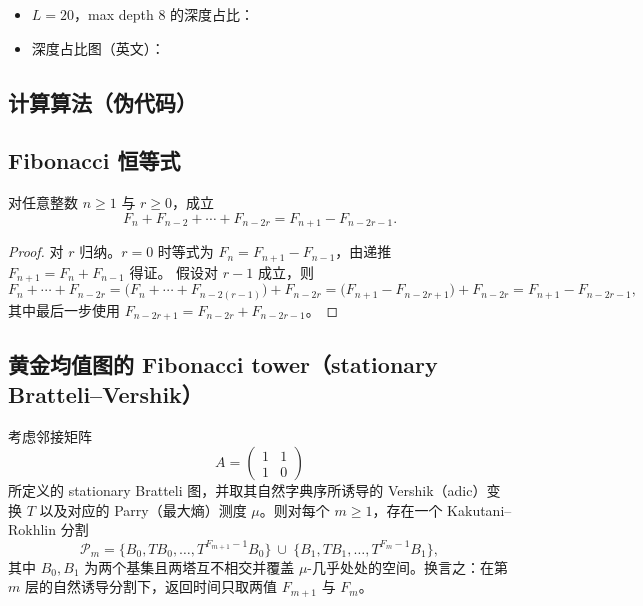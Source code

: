\begin{itemize}
\item $L=20$，max depth $8$ 的深度占比：
\item 深度占比图（英文）：
\end{itemize}

\subsection{计算算法（伪代码）}

\subsection{Fibonacci 恒等式}

\begin{lemma}[交错和恒等式]\label{lem:fib-alternating-sum}
对任意整数 $n\ge 1$ 与 $r\ge 0$，成立
$$
F_n+F_{n-2}+\cdots+F_{n-2r}=F_{n+1}-F_{n-2r-1}.
$$
\end{lemma}

\begin{proof}
对 $r$ 归纳。$r=0$ 时等式为 $F_n=F_{n+1}-F_{n-1}$，由递推 $F_{n+1}=F_n+F_{n-1}$ 得证。
假设对 $r-1$ 成立，则
$$
F_n+\cdots+F_{n-2r}
=\big(F_n+\cdots+F_{n-2(r-1)}\big)+F_{n-2r}
=\big(F_{n+1}-F_{n-2r+1}\big)+F_{n-2r}
=F_{n+1}-F_{n-2r-1},
$$
其中最后一步使用 $F_{n-2r+1}=F_{n-2r}+F_{n-2r-1}$。
\end{proof}

\subsection{黄金均值图的 Fibonacci tower（stationary Bratteli--Vershik）}

\begin{proposition}\label{prop:fib-tower-heights}
考虑邻接矩阵
$$
A=\begin{pmatrix}1&1\\1&0\end{pmatrix}
$$
所定义的 stationary Bratteli 图，并取其自然字典序所诱导的 Vershik（adic）变换 $T$ 以及对应的 Parry（最大熵）测度 $\mu$。则对每个 $m\ge 1$，存在一个 Kakutani--Rokhlin 分割
$$
\mathcal{P}_m=\{B_0,TB_0,\dots,T^{F_{m+1}-1}B_0\}\ \cup\ \{B_1,TB_1,\dots,T^{F_m-1}B_1\},
$$
其中 $B_0,B_1$ 为两个基集且两塔互不相交并覆盖 $\mu$-几乎处处的空间。换言之：在第 $m$ 层的自然诱导分割下，返回时间只取两值 $F_{m+1}$ 与 $F_m$。
\end{proposition}

